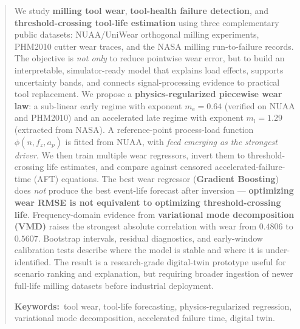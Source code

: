 \documentclass[11pt,a4paper]{article}
\newcommand{\earlyexp}{m_{\mathrm{e}}}
\newcommand{\lateexp}{m_{\mathrm{l}}}
\newcommand{\dataset}[1]{\textsf{#1}}
\begin{document}
\maketitle
\thispagestyle{empty}

\begin{abstract}\noindent
We study \textbf{milling tool wear}, \textbf{tool-health failure detection}, and \textbf{threshold-crossing tool-life estimation} using three complementary public datasets: \dataset{NUAA}/\dataset{UniWear} orthogonal milling experiments, \dataset{PHM2010} cutter wear traces, and the \dataset{NASA} milling run-to-failure records. The objective is \emph{not only} to reduce pointwise wear error, but to build an interpretable, simulator-ready model that explains load effects, supports uncertainty bands, and connects signal-processing evidence to practical tool replacement. We propose a \textbf{physics-regularized piecewise wear law}: a sub-linear early regime with exponent \(\earlyexp=\mathbf{0.64}\) (verified on NUAA and PHM2010) and an accelerated late regime with exponent \(\lateexp=\mathbf{1.29}\) (extracted from NASA). A reference-point process-load function \(\phi(n,f_z,a_p)\) is fitted from NUAA, with \emph{feed emerging as the strongest driver}. We then train multiple wear regressors, invert them to threshold-crossing life estimates, and compare against censored accelerated-failure-time (AFT) equations. The best wear regressor (\textbf{Gradient Boosting}) does \emph{not} produce the best event-life forecast after inversion --- \textbf{optimizing wear RMSE is not equivalent to optimizing threshold-crossing life}. Frequency-domain evidence from \textbf{variational mode decomposition (VMD)} raises the strongest absolute correlation with wear from \(0.4806\) to \(\mathbf{0.5607}\). Bootstrap intervals, residual diagnostics, and early-window calibration tests describe where the model is stable and where it is under-identified. The result is a research-grade digital-twin prototype useful for scenario ranking and explanation, but requiring broader ingestion of newer full-life milling datasets before industrial deployment.

\medskip
\noindent\textbf{Keywords:}\ tool wear, tool-life forecasting, physics-regularized regression, variational mode decomposition, accelerated failure time, digital twin.
\end{abstract}
\end{document}
